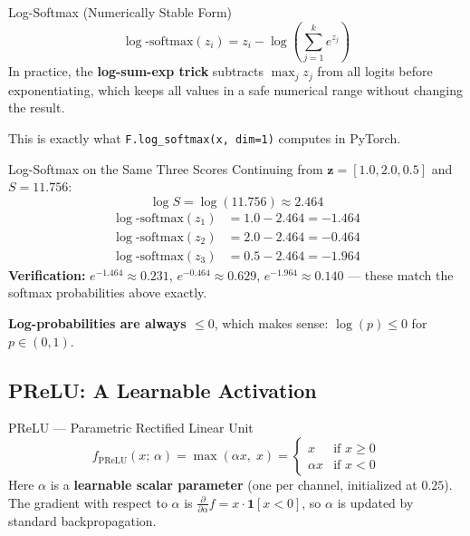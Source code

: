 \begin{mathbox}{Log-Softmax (Numerically Stable Form)}
\begin{equation}
    \log\text{-softmax}(z_i) = z_i - \log\!\left(\sum_{j=1}^{k} e^{z_j}\right)
\end{equation}
In practice, the \textbf{log-sum-exp trick} subtracts $\max_j z_j$ from all logits before exponentiating, which keeps all values in a safe numerical range without changing the result.

This is exactly what \texttt{F.log\_softmax(x, dim=1)} computes in PyTorch.
\end{mathbox}

\begin{examplebox}{Log-Softmax on the Same Three Scores}
Continuing from $\mathbf{z} = [1.0, 2.0, 0.5]$ and $S = 11.756$:
\[
    \log S = \log(11.756) \approx 2.464
\]
\begin{align*}
    \log\text{-softmax}(z_1) &= 1.0 - 2.464 = -1.464 \\
    \log\text{-softmax}(z_2) &= 2.0 - 2.464 = -0.464 \\
    \log\text{-softmax}(z_3) &= 0.5 - 2.464 = -1.964
\end{align*}
\textbf{Verification:} $e^{-1.464} \approx 0.231$, $e^{-0.464} \approx 0.629$, $e^{-1.964} \approx 0.140$ --- these match the softmax probabilities above exactly.

\textbf{Log-probabilities are always $\le 0$}, which makes sense: $\log(p) \le 0$ for $p \in (0,1)$.
\end{examplebox}

\subsection{PReLU: A Learnable Activation}

\begin{mathbox}{PReLU --- Parametric Rectified Linear Unit}
\begin{equation}
    f_{\text{PReLU}}(x;\, \alpha) = \max(\alpha x,\; x) =
    \begin{cases}
        x    & \text{if } x \ge 0 \\
        \alpha x & \text{if } x < 0
    \end{cases}
\end{equation}
Here $\alpha$ is a \textbf{learnable scalar parameter} (one per channel, initialized at $0.25$). The gradient with respect to $\alpha$ is $\frac{\partial}{\partial \alpha} f = x \cdot \mathbf{1}[x < 0]$, so $\alpha$ is updated by standard backpropagation.
\end{mathbox}

